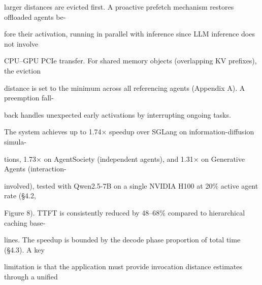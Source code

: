 \begin{flushleft}
\noindent larger distances are evicted first. A proactive prefetch mechanism restores offloaded agents be-\par
\noindent fore their activation, running in parallel with inference since LLM inference does not involve\par
\noindent CPU–GPU PCIe transfer. For shared memory objects (overlapping KV prefixes), the eviction\par
\noindent distance is set to the minimum across all referencing agents (Appendix A). A preemption fall-\par
\noindent back handles unexpected early activations by interrupting ongoing tasks.\par
\noindent  The system achieves up to 1.74× speedup over SGLang on information-diffusion simula-\par
\noindent tions, 1.73× on AgentSociety (independent agents), and 1.31× on Generative Agents (interaction-\par
\noindent involved), tested with Qwen2.5-7B on a single NVIDIA H100 at 20\% active agent rate (§4.2,\par
\noindent Figure 8). TTFT is consistently reduced by 48–68\% compared to hierarchical caching base-\par
\noindent lines. The speedup is bounded by the decode phase proportion of total time (§4.3). A key\par
\noindent limitation is that the application must provide invocation distance estimates through a unified\par
\end{flushleft}
